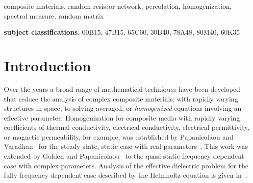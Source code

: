 \documentclass{cmslatex}
\begin{document}
\begin{keywords}
composite materials, random resistor network, percolation,
homogenization, spectral measure, random matrix 
\smallskip

{\bf subject classifications.}
00B15,
47B15,
65C60,
30B40,
78A48,
80M40,
60K35
\end{keywords}


\section{Introduction}\label{Introduction}
%
Over the years a broad range of mathematical techniques have been
developed that reduce the analysis of complex composite materials,
with rapidly varying structures in space, to solving averaged, or
\emph{homogenized} equations involving an effective parameter.
Homogenization for composite media with rapidly varying coefficients
of thermal conductivity,  
electrical conductivity, electrical permittivity, or magnetic permeability,
for example,
was established by Papanicolaou and Varadhan~\cite{Papanicolaou:RF-835}
for the steady state, static case with real parameters~\cite{MILTON:2002:TC}. 
This work was extended
by Golden and Papanicolaou~\cite{Golden:CMP-473,Golden:JSP-655} to the
quasi-static frequency dependent case with complex
parameters. Analysis of the effective dielectric problem for the fully
frequency dependent case described by the Helmholtz equation is given
in~\cite{Simeonova:MMS:1113}.
\end{document}
